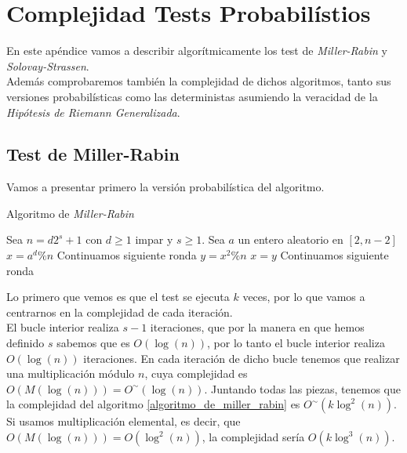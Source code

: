 
\chapter{Complejidad Tests Probabilístios}\label{complejidad_tests_probabilisticos}

En este apéndice vamos a describir algorítmicamente los test de \textit{Miller-Rabin} y \textit{Solovay-Strassen}.\\

Además comprobaremos también la complejidad de dichos algoritmos, tanto sus versiones probabilísticas como las deterministas asumiendo la veracidad de la \textit{Hipótesis de Riemann Generalizada}.

\section{Test de Miller-Rabin}

Vamos a presentar primero la versión probabilística del algoritmo.

\begin{algorithm}[H]
	\caption{Algoritmo de \textit{Miller-Rabin}}\label{algoritmo_de_miller_rabin}
	\begin{algorithmic}[1]
			\State Sea $n = d2^s + 1$ con $d \geq 1$ impar y $s \geq 1$.
				\State Sea $a$ un entero aleatorio en $[2, n-2]$
				\State $x = a^d \% n$
					\State Continuamos siguiente ronda
				\EndIf
					\State $y = x^2 \% n$
						\State {}
					\EndIf
					\State $x = y$
						\State Continuamos siguiente ronda
					\EndIf
				\EndFor
				\State {}
			\EndFor
			\State {}
		\EndProcedure
	\end{algorithmic}
\end{algorithm}

Lo primero que vemos es que el test se ejecuta $k$ veces, por lo que vamos a centrarnos en la complejidad de cada iteración.\\

El bucle interior realiza $s-1$ iteraciones, que por la manera en que hemos definido $s$ sabemos que es $O(\log(n))$, por lo tanto el bucle interior realiza $O(\log(n))$ iteraciones. En cada iteración de dicho bucle tenemos que realizar una multiplicación módulo $n$, cuya complejidad es $O(M(\log(n))) = O^\sim(\log(n))$. Juntando todas las piezas, tenemos que la complejidad del algoritmo \ref{algoritmo_de_miller_rabin} es $O^\sim(k\log^2(n))$. Si usamos multiplicación elemental, es decir, que $O(M(\log(n))) = O(\log^2(n))$, la complejidad sería $O(k\log^3(n))$.\\

